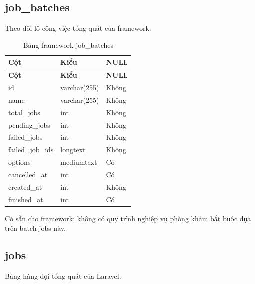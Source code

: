 \subsection{job\_\allowbreak{}batches}
Theo dõi lô công việc tổng quát của framework.\allowbreak{}


{\fontsize{10}{12}\selectfont\setlength{\tabcolsep}{3pt}\renewcommand{\arraystretch}{1.12}
\begin{longtable}{@{}L{\textwidth-5.28pt\relax} L{\textwidth-4.8pt\relax} L{\textwidth-1.92pt\relax}@{}}
\caption{Bảng framework job\_\allowbreak{}batches}\\
\toprule
\textbf{Cột} & \textbf{Kiểu} & \textbf{NULL}\\\midrule
\endfirsthead
\toprule
\textbf{Cột} & \textbf{Kiểu} & \textbf{NULL}\\\midrule
\endhead
\bottomrule\endlastfoot
id & varchar(255) & Không\\[1pt]
name & varchar(255) & Không\\[1pt]
total\_\allowbreak{}jobs & int & Không\\[1pt]
pending\_\allowbreak{}jobs & int & Không\\[1pt]
failed\_\allowbreak{}jobs & int & Không\\[1pt]
failed\_\allowbreak{}job\_\allowbreak{}ids & longtext & Không\\[1pt]
options & mediumtext & Có\\[1pt]
cancelled\_\allowbreak{}at & int & Có\\[1pt]
created\_\allowbreak{}at & int & Không\\[1pt]
finished\_\allowbreak{}at & int & Có\\[1pt]
\end{longtable}}
{\small Có sẵn cho framework; không có quy trình nghiệp vụ phòng khám bắt buộc dựa trên batch jobs này.\allowbreak{}

}

\subsection{jobs}
Bảng hàng đợi tổng quát của Laravel.\allowbreak{}


